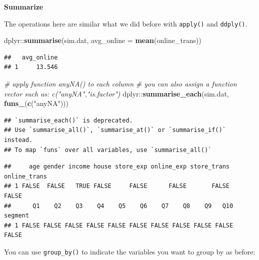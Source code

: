 \documentclass[]{book}
\newenvironment{Shaded}{\begin{snugshade}}{\end{snugshade}}
\newcommand{\KeywordTok}[1]{\textcolor[rgb]{0.13,0.29,0.53}{\textbf{{#1}}}}
\newcommand{\DataTypeTok}[1]{\textcolor[rgb]{0.13,0.29,0.53}{{#1}}}
\newcommand{\StringTok}[1]{\textcolor[rgb]{0.31,0.60,0.02}{{#1}}}
\newcommand{\CommentTok}[1]{\textcolor[rgb]{0.56,0.35,0.01}{\textit{{#1}}}}
\newcommand{\NormalTok}[1]{{#1}}
\theoremstyle{definition}
\theoremstyle{definition}
\theoremstyle{remark}
\begin{document}
\textbf{Summarize}

The operations here are similar what we did before with \texttt{apply()}
and \texttt{ddply()}.

\begin{Shaded}
\begin{Highlighting}[]
\NormalTok{dplyr::}\KeywordTok{summarise}\NormalTok{(sim.dat, }\DataTypeTok{avg_online =} \KeywordTok{mean}\NormalTok{(online_trans)) }
\end{Highlighting}
\end{Shaded}

\begin{verbatim}
##   avg_online
## 1     13.546
\end{verbatim}

\begin{Shaded}
\begin{Highlighting}[]
\CommentTok{# apply function anyNA() to each column}
\CommentTok{# you can also assign a function vector such as: c("anyNA","is.factor")}
\NormalTok{dplyr::}\KeywordTok{summarise_each}\NormalTok{(sim.dat, }\KeywordTok{funs_}\NormalTok{(}\KeywordTok{c}\NormalTok{(}\StringTok{"anyNA"}\NormalTok{)))}
\end{Highlighting}
\end{Shaded}

\begin{verbatim}
## `summarise_each()` is deprecated.
## Use `summarise_all()`, `summarise_at()` or `summarise_if()` instead.
## To map `funs` over all variables, use `summarise_all()`
\end{verbatim}

\begin{verbatim}
##     age gender income house store_exp online_exp store_trans online_trans
## 1 FALSE  FALSE   TRUE FALSE     FALSE      FALSE       FALSE        FALSE
##      Q1    Q2    Q3    Q4    Q5    Q6    Q7    Q8    Q9   Q10 segment
## 1 FALSE FALSE FALSE FALSE FALSE FALSE FALSE FALSE FALSE FALSE   FALSE
\end{verbatim}

You can use \texttt{group\_by()} to indicate the variables you want to
group by as before:

\begin{Shaded}
\end{Shaded}
\end{document}
